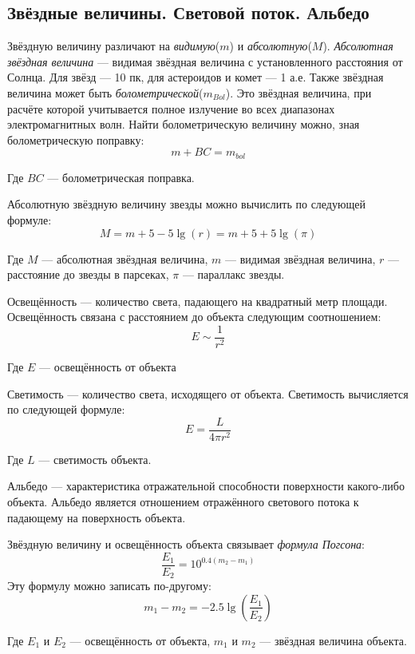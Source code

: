 \subsection{Звёздные величины. Световой поток. Альбедо}

Звёздную величину различают на \textit{видимую}($m$) и \textit{абсолютную}($M$). \textit{Абсолютная звёздная величина} --- видимая звёздная величина с установленного расстояния от Солнца. Для звёзд --- 10 пк, для астероидов и комет  --- 1 а.е. Также звёздная величина может быть \textit{болометрической}($m_{Bol}$). Это звёздная величина, при расчёте которой учитывается полное излучение во всех диапазонах электромагнитных волн. Найти болометрическую величину можно, зная болометрическую поправку:
\begin{equation}
m+BC=m_{bol}
\end{equation}

Где $BC$ --- болометрическая поправка.

Абсолютную звёздную величину звезды можно вычислить по следующей формуле:
\begin{equation}
M=m+5-5\lg(r)=m+5+5\lg(\pi)
\end{equation}

Где $M$ --- абсолютная звёздная величина, $m$ --- видимая звёздная величина, $r$ --- расстояние до звезды в парсеках, $\pi$ --- параллакс звезды.

Освещённость --- количество света, падающего на квадратный метр площади. Освещённость связана с расстоянием до объекта следующим соотношением:
\begin{equation}
E\sim \frac{1}{r^2}
\end{equation}

Где $E$ --- освещённость от объекта

Светимость --- количество света, исходящего от объекта. Светимость вычисляется по следующей формуле:
\begin{equation}
E=\frac{L}{4\pi r^2}
\end{equation}

Где $L$ --- светимость объекта.

Альбедо --- характеристика отражательной способности поверхности какого-либо объекта. Альбедо является отношением отражённого светового потока к падающему на поверхность объекта.

Звёздную величину и освещённость объекта связывает \textit{формула Погсона}:
\begin{equation}
\frac{E_1}{E_2}=10^{0.4(m_2-m_1)}
\end{equation}
Эту формулу можно записать по-другому:
\begin{equation}
m_1-m_2=-2.5\lg\left(\frac{E_1}{E_2}\right)
\end{equation}

Где $E_1$ и $E_2$ --- освещённость от объекта, $m_1$ и $m_2$ --- звёздная величина объекта.